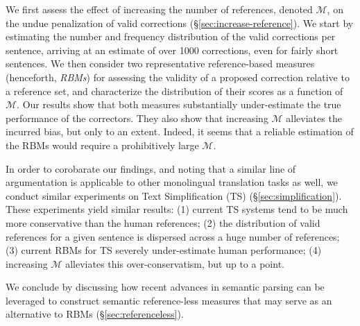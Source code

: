 \documentclass[letterpaper, 11pt]{article}
\begin{document}
We first assess the effect of increasing the number of references, denoted $\mathcal{M}$, on 
the undue penalization of valid corrections (\S \ref{sec:increase-reference}).
We start by estimating the number and frequency distribution of the valid corrections per sentence, arriving 
at an estimate of over 1000 corrections, even for fairly short sentences.
We then consider two representative reference-based measures (henceforth, {\it RBMs}) for
assessing the validity of a proposed correction relative to a reference set, 
and characterize the distribution of their scores as a function of $\mathcal{M}$. 
Our results show that both measures substantially under-estimate the true performance of
the correctors. They also show that increasing $\mathcal{M}$ alleviates the incurred bias, 
but only to an extent. Indeed, it seems that a reliable estimation of the RBMs would
require a prohibitively large $\mathcal{M}$.

In order to corobarate our findings, and noting that a similar line of argumentation is applicable to other monolingual translation tasks as well, 
we conduct similar experiments on Text Simplification (TS) (\S\ref{sec:simplification}).
These experiments yield similar results: (1) current TS systems tend to be much more conservative than the human references;
(2) the distribution of valid references for a given sentence is dispersed across a huge number of references; (3) current RBMs for TS
severely under-estimate human performance; (4) increasing $\mathcal{M}$ alleviates this over-conservatism, but up to a point.

We conclude by discussing how recent advances in semantic parsing can be leveraged to construct semantic reference-less measures that 
may serve as an alternative to RBMs (\S\ref{sec:referenceless}). 


\end{document}
